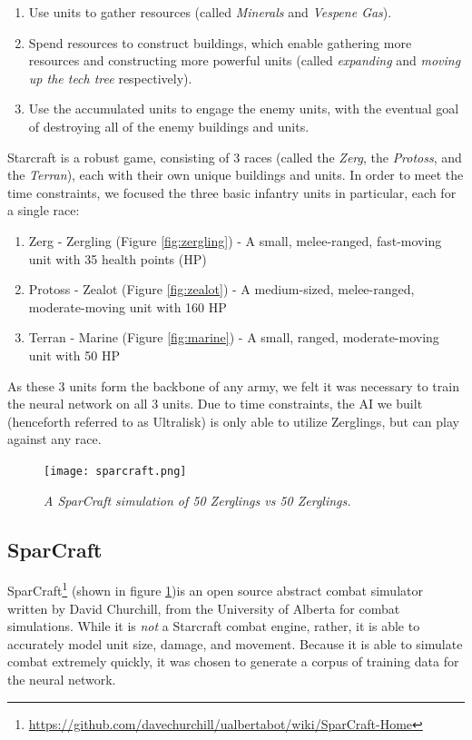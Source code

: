 \documentclass[twocolumn]{article}
\begin{document}
\begin{enumerate}
  \item Use units to gather resources (called \textit{Minerals} and \textit{Vespene Gas}).
  \item Spend resources to construct buildings, which enable gathering more resources and constructing more powerful units (called \textit{expanding} and \textit{moving up the tech tree} respectively). 
  \item Use the accumulated units to engage the enemy units, with the eventual goal of destroying all of the enemy buildings and units. 
\end{enumerate}

Starcraft is a robust game, consisting of 3 races (called the \textit{Zerg}, the \textit{Protoss}, and the \textit{Terran}), each with their own unique buildings and units. In order to meet the time constraints, we focused the three basic infantry units in particular, each for a single race: 

\begin{enumerate}
  \item Zerg - Zergling (Figure \ref{fig:zergling}) - A small, melee-ranged, fast-moving unit with 35 health points (HP)
  \item Protoss - Zealot (Figure \ref{fig:zealot}) - A medium-sized, melee-ranged, moderate-moving unit with 160 HP
  \item Terran - Marine (Figure \ref{fig:marine}) - A small, ranged, moderate-moving unit with 50 HP
\end{enumerate}

As these 3 units form the backbone of any army, we felt it was necessary to train the neural network on all 3 units. Due to time constraints, the AI we built (henceforth referred to as Ultralisk) is only able to utilize Zerglings, but can play against any race. 

\begin{figure}[ht]
	\begin{center}
		\texttt{[image: sparcraft.png]}
	\end{center}
	\caption{\textit{A SparCraft simulation of 50 Zerglings vs 50 Zerglings. }}
	\label{fig:sparcraft}
\end{figure}

\subsection{SparCraft}
SparCraft\footnote{\tiny{\url{https://github.com/davechurchill/ualbertabot/wiki/SparCraft-Home}}} (shown in figure \ref{fig:sparcraft})is an open source abstract combat simulator written by David Churchill, from the University of Alberta for combat simulations. While it is \textit{not} a Starcraft combat engine, rather, it is able to accurately model unit size, damage, and movement. Because it is able to simulate combat extremely quickly, it was chosen to generate a corpus of training data for the neural network. 
\end{document}
